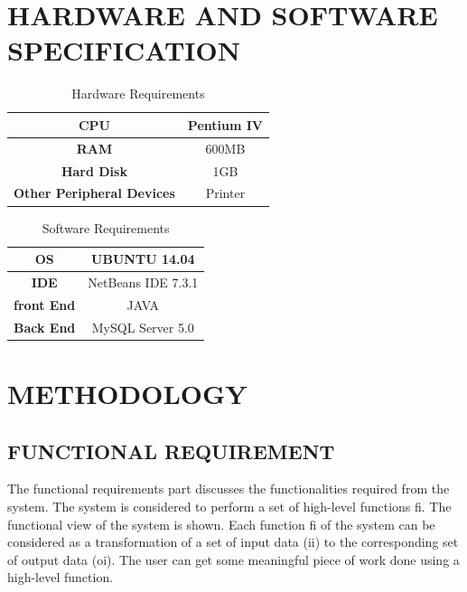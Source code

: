 \section{HARDWARE AND SOFTWARE SPECIFICATION}

\begin{table}[H]
\centering
\caption{Hardware Requirements}
\label{Hardware Requirements}
\begin{tabular}{|c|c|}
\hline
\textbf{CPU}                      & Pentium IV \\ \hline
\textbf{RAM}                      & 600MB      \\ \hline
\textbf{Hard Disk}                & 1GB        \\ \hline
\textbf{Other Peripheral Devices} & Printer    \\ \hline
\end{tabular}
\end{table}



\begin{table}[H]
\centering
\caption{Software Requirements}
\label{Software Requirements}
\begin{tabular}{|c|c|}
\hline
\textbf{OS}                      & UBUNTU 14.04 \\ \hline
\textbf{IDE}                      & NetBeans IDE 7.3.1      \\ \hline
\textbf{front End}                & JAVA        \\ \hline
\textbf{Back End} & MySQL Server 5.0    \\ \hline
\end{tabular}
\end{table}

\section{METHODOLOGY}
\subsection{FUNCTIONAL REQUIREMENT}

The functional requirements part discusses the functionalities required from the system. The system is considered to perform a set of high-level functions {fi}. The functional view of the system is shown. Each function fi of the system can be considered as a transformation of a set of input data (ii) to the corresponding set of output data (oi). The user can get some meaningful piece of work done using a high-level function.


